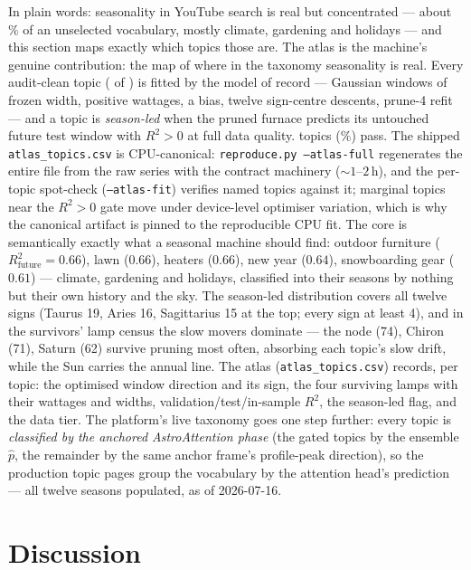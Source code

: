 \documentclass[11pt]{artaquest}
\begin{document}
In plain words: seasonality in YouTube search is real but concentrated --- about \predictablePct\% of an
unselected vocabulary, mostly climate, gardening and holidays --- and this section maps exactly
which topics those are. The atlas is the machine's genuine contribution: the map of where in the
taxonomy seasonality is real. Every audit-clean topic (\nTopicsFit{} of \nVocab{}) is fitted by the model of record ---
Gaussian windows of frozen width, positive wattages, a bias, twelve sign-centre descents,
prune-4 refit --- and a topic is \emph{season-led} when the pruned furnace predicts its untouched
future test window with $R^2 > 0$ at full data quality. \seasonLed{} topics (\predictablePct\%)
pass. The shipped \texttt{atlas\_topics.csv} is CPU-canonical: \texttt{reproduce.py
--atlas-full} regenerates the entire file from the raw series with the contract machinery
(${\sim}1$--$2$\,h), and the per-topic spot-check (\texttt{--atlas-fit}) verifies named topics
against it; marginal topics near the $R^2 > 0$ gate move under device-level optimiser variation,
which is why the canonical artifact is pinned to the reproducible CPU fit. The core is
semantically exactly what a seasonal machine should find: outdoor furniture
($R^2_{\mathrm{future}} = 0.66$), lawn ($0.66$), heaters ($0.66$), new year ($0.64$),
snowboarding gear ($0.61$) --- climate, gardening and holidays, classified into their seasons by
nothing but their own history and the sky. The season-led distribution covers all twelve signs
(Taurus 19, Aries 16, Sagittarius 15 at the top; every sign at least 4), and in the survivors'
lamp census the slow movers dominate --- the node (74), Chiron (71), Saturn (62) survive pruning
most often, absorbing each topic's slow drift, while the Sun carries the annual line. The atlas
(\texttt{atlas\_topics.csv}) records, per topic: the optimised window direction and its sign, the
four surviving lamps with their wattages and widths, validation/test/in-sample $R^2$, the
season-led flag, and the data tier. The platform's live taxonomy goes one step further: every
topic is \emph{classified by the anchored AstroAttention phase} (the \attnLed{} gated topics by
the ensemble $\hat{p}$, the remainder by the same anchor frame's profile-peak direction), so the
production topic pages group the vocabulary by the attention head's prediction --- all twelve
seasons populated, as of 2026-07-16.

\section{Discussion}
\end{document}
